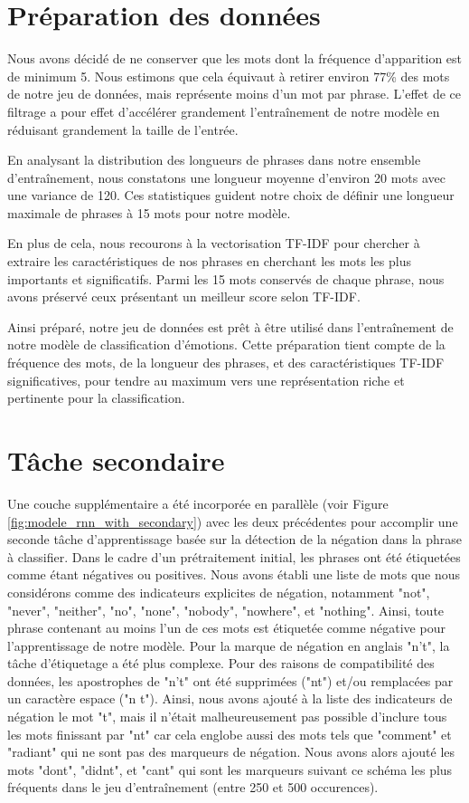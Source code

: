 \documentclass{article}
\begin{document}
\section{Préparation des données}
Nous avons décidé de ne conserver que les mots dont la fréquence d’apparition est de minimum 5. 
Nous estimons que cela équivaut à retirer environ 77\% des mots de notre jeu de données, mais représente moins d'un mot par phrase.
L’effet de ce filtrage a pour effet d’accélérer grandement l’entraînement de notre modèle en réduisant grandement la taille de l'entrée. 

En analysant la distribution des longueurs de phrases dans notre ensemble d'entraînement, 
nous constatons une longueur moyenne d'environ 20 mots avec une variance de 120. 
Ces statistiques guident notre choix de définir une longueur maximale de phrases à 15 mots pour notre modèle. 

En plus de cela, nous recourons à la vectorisation TF-IDF pour chercher à extraire les caractéristiques de nos phrases en cherchant les mots les plus importants et significatifs. 
Parmi les 15 mots conservés de chaque phrase, nous avons préservé ceux présentant un meilleur score selon TF-IDF. 

Ainsi préparé, notre jeu de données est prêt à être utilisé dans l'entraînement de notre modèle de classification d'émotions. Cette préparation tient compte de la fréquence des mots, de la longueur des phrases, et des caractéristiques TF-IDF significatives, pour tendre au maximum vers une représentation riche et pertinente pour la classification.

\section{Tâche secondaire}
Une couche supplémentaire a été incorporée en parallèle (voir Figure \ref{fig:modele_rnn_with_secondary}) avec les deux précédentes pour accomplir une seconde tâche d'apprentissage basée sur la détection de la négation dans la phrase à classifier. 
Dans le cadre d'un prétraitement initial, les phrases ont été étiquetées comme étant négatives ou positives. 
Nous avons établi une liste de mots que nous considérons comme des indicateurs explicites de négation, notamment "not", "never", "neither", "no", "none", "nobody", "nowhere", et "nothing". 
Ainsi, toute phrase contenant au moins l'un de ces mots est étiquetée comme négative pour l'apprentissage de notre modèle. Pour la marque de négation en anglais "n't", la tâche d'étiquetage a été plus complexe. 
Pour des raisons de compatibilité des données, les apostrophes de "n't" ont été supprimées ("nt") et/ou remplacées par un caractère espace ("n t"). 
Ainsi, nous avons ajouté à la liste des indicateurs de négation le mot "t", mais il n'était malheureusement pas possible d'inclure tous les mots finissant par "nt" car cela englobe aussi des mots tels que "comment" et "radiant" qui ne sont pas des marqueurs de négation. 
Nous avons alors ajouté les mots "dont", "didnt", et "cant" qui sont les marqueurs suivant ce schéma les plus fréquents dans le jeu d'entraînement (entre 250 et 500 occurences). 
\end{document}
